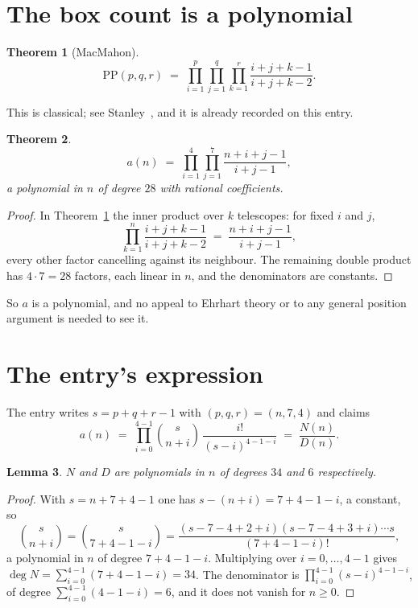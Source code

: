 \documentclass[11pt,a4paper]{article}
\theoremstyle{plain}
\newtheorem{theorem}{Theorem}
\newtheorem{lemma}[theorem]{Lemma}
\theoremstyle{definition}
\begin{document}
\section{The box count is a polynomial}

\begin{theorem}[MacMahon]\label{thm:mm}
\[
\mathrm{PP}(p,q,r)\;=\;\prod_{i=1}^{p}\prod_{j=1}^{q}\prod_{k=1}^{r}
\frac{i+j+k-1}{i+j+k-2} .
\]
\end{theorem}

This is classical; see Stanley~\cite{stanley}, and it is already recorded on this entry.

\begin{theorem}\label{thm:poly}
\[
a(n)\;=\;\prod_{i=1}^{4}\prod_{j=1}^{7}\frac{n+i+j-1}{i+j-1},
\]
a polynomial in $n$ of degree $28$ with rational coefficients.
\end{theorem}

\begin{proof}
In Theorem~\ref{thm:mm} the inner product over $k$ telescopes: for fixed $i$ and $j$,
\[
\prod_{k=1}^{n}\frac{i+j+k-1}{i+j+k-2}\;=\;\frac{n+i+j-1}{i+j-1} ,
\]
every other factor cancelling against its neighbour. The remaining double product has
$4\cdot7=28$ factors, each linear in $n$, and the denominators are constants.
\end{proof}

So $a$ is a polynomial, and no appeal to Ehrhart theory or to any general position argument is
needed to see it.

\section{The entry's expression}

The entry writes $s=p+q+r-1$ with $(p,q,r)=(n,7,4)$ and claims
\[
a(n)\;=\;\prod_{i=0}^{4-1}\binom{s}{n+i}\,\frac{i!}{(s-i)^{4-1-i}}\;=\;
\frac{N(n)}{D(n)} .
\]

\begin{lemma}\label{lem:deg}
$N$ and $D$ are polynomials in $n$ of degrees $34$ and $6$ respectively.
\end{lemma}

\begin{proof}
With $s=n+7+4-1$ one has $s-(n+i)=7+4-1-i$, a constant, so
\[
\binom{s}{n+i}=\binom{s}{7+4-1-i}
=\frac{(s-7-4+2+i)(s-7-4+3+i)\cdots s}{(7+4-1-i)!},
\]
a polynomial in $n$ of degree $7+4-1-i$. Multiplying over $i=0,\dots,4-1$ gives
$\deg N=\sum_{i=0}^{4-1}(7+4-1-i)=34$. The denominator is
$\prod_{i=0}^{4-1}(s-i)^{4-1-i}$, of degree
$\sum_{i=0}^{4-1}(4-1-i)=6$, and it does not vanish for $n\ge0$.
\end{proof}
\end{document}

